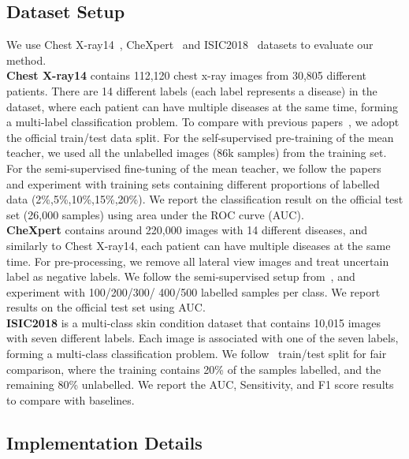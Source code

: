 \documentclass[runningheads]{llncs}
\begin{document}
\subsection{Dataset Setup}
We use Chest X-ray14~\cite{wang2017chestx}, CheXpert~\cite{irvin2019chexpert} and ISIC2018~\cite{tschandl2018ham10000, codella2019skin} datasets to evaluate our method. \\
\textbf{Chest X-ray14} contains 112,120 chest x-ray images from 30,805 different patients. There are 14 different labels (each label represents a disease) in the dataset, where each patient can have multiple diseases at the same time, forming a multi-label classification problem. To compare with previous papers~\cite{aviles2019graphx,liu2020semi}, we adopt the official train/test data split. For the self-supervised pre-training of the mean teacher, we used all the unlabelled images (86k samples) from the training set. For the semi-supervised fine-tuning of the mean teacher, we follow the papers~\cite{aviles2019graphx,liu2020semi} and experiment with training sets containing different proportions of labelled data (2\%,5\%,10\%,15\%,20\%). We report the classification result on the official test set (26,000 samples) using area under the ROC curve (AUC).\\
\textbf{CheXpert} contains around 220,000 images with 14 different diseases, and similarly to Chest X-ray14, each patient can have multiple diseases at the same time. For pre-processing, we remove all lateral view images and treat uncertain label as negative labels. We follow the semi-supervised setup from~\cite{gyawali2020semi}, and experiment with 100/200/300/ 400/500 labelled samples per class. We report results on the official test set using AUC.\\
\textbf{ISIC2018} is a multi-class skin condition dataset that contains 10,015 images with seven different labels. Each image is associated with one of the seven labels, forming a multi-class classification problem. We follow~\cite{liu2020semi} train/test split for fair comparison, where the training contains 20\% of the samples labelled, and the remaining 80\% unlabelled. We report the AUC, Sensitivity, and F1 score results to compare with baselines.





\subsection{Implementation Details}
\end{document}
